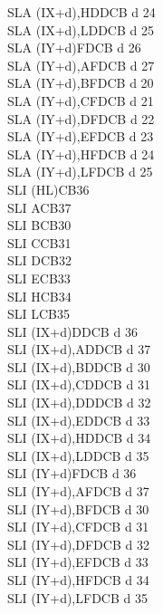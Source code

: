 \begin{multicols}{3}
{\begin{tabbing}
        SLA (IX+d),H\UNDOC\>DDCB d 24\\
        SLA (IX+d),L\UNDOC\>DDCB d 25\\
        SLA (IY+d)\>FDCB d 26\\
        SLA (IY+d),A\UNDOC\>FDCB d 27\\
        SLA (IY+d),B\UNDOC\>FDCB d 20\\
        SLA (IY+d),C\UNDOC\>FDCB d 21\\
        SLA (IY+d),D\UNDOC\>FDCB d 22\\
        SLA (IY+d),E\UNDOC\>FDCB d 23\\
        SLA (IY+d),H\UNDOC\>FDCB d 24\\
        SLA (IY+d),L\UNDOC\>FDCB d 25\\
        SLI (HL)\UNDOC\>CB36\\
        SLI A\UNDOC\>CB37\\
        SLI B\UNDOC\>CB30\\
        SLI C\UNDOC\>CB31\\
        SLI D\UNDOC\>CB32\\
        SLI E\UNDOC\>CB33\\
        SLI H\UNDOC\>CB34\\
        SLI L\UNDOC\>CB35\\
        SLI (IX+d)\UNDOC\>DDCB d 36\\
        SLI (IX+d),A\UNDOC\>DDCB d 37\\
        SLI (IX+d),B\UNDOC\>DDCB d 30\\
        SLI (IX+d),C\UNDOC\>DDCB d 31\\
        SLI (IX+d),D\UNDOC\>DDCB d 32\\
        SLI (IX+d),E\UNDOC\>DDCB d 33\\
        SLI (IX+d),H\UNDOC\>DDCB d 34\\
        SLI (IX+d),L\UNDOC\>DDCB d 35\\
        SLI (IY+d)\UNDOC\>FDCB d 36\\
        SLI (IY+d),A\UNDOC\>FDCB d 37\\
        SLI (IY+d),B\UNDOC\>FDCB d 30\\
        SLI (IY+d),C\UNDOC\>FDCB d 31\\
        SLI (IY+d),D\UNDOC\>FDCB d 32\\
        SLI (IY+d),E\UNDOC\>FDCB d 33\\
        SLI (IY+d),H\UNDOC\>FDCB d 34\\
        SLI (IY+d),L\UNDOC\>FDCB d 35\\

\end{tabbing}}
\end{multicols}
